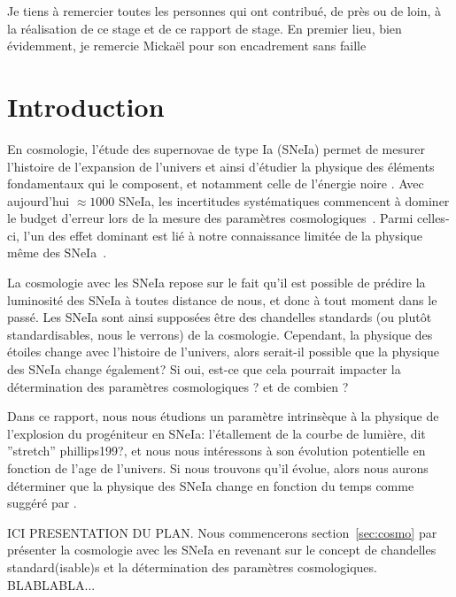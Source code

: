 \documentclass[a4paper, 12pt, svgnames]{article}
\newcommand{\mr}[1]{{\textcolor[rgb]{0.80,0.10,0.1}{#1}}}
\begin{document}

Je tiens à remercier toutes les personnes qui ont contribué, de près ou de loin,
à la réalisation de ce stage et de ce rapport de stage. En premier lieu, bien
évidemment, je remercie Mickaël  pour son encadrement sans faille

\tableofcontents
\newpage

\section{Introduction}\label{sec:int}

En cosmologie, l'étude des supernovae de type Ia (SNeIa) permet de mesurer
l'histoire de l'expansion de l'univers et ainsi d'étudier la physique des
éléments fondamentaux qui le composent, et notamment celle de l'énergie noire
\cite{perlmutter_measurements_1999, riess_observational_1998}. Avec aujourd'hui
$\approx1000$ SNeIa, les incertitudes systématiques commencent à dominer le
budget d'erreur lors de la mesure des paramètres
cosmologiques~\cite{betoule_improved_2014, scolnic_complete_2018}. Parmi
celles-ci, l'un des effet dominant est lié à notre connaissance limitée de la
physique même des SNeIa~\cite{sullivan_dependence_2010, rigault_evidence_2013,
rigault_confirmation_2015}.

La cosmologie avec les SNeIa repose sur le fait qu'il est possible de
prédire la luminosité des SNeIa à toutes distance de nous, et donc à tout moment
dans le passé. Les SNeIa sont ainsi supposées être des chandelles standards (ou
plutôt standardisables, nous le verrons) de la cosmologie. Cependant, la
physique des étoiles change avec l'histoire de l'univers, alors serait-il
possible que la physique des SNeIa change également? Si oui, est-ce que cela
pourrait impacter la détermination des paramètres cosmologiques ? et de combien
? 

Dans ce rapport, nous \mr{nous étudions un paramètre intrinsèque à la physique
de l'explosion du progéniteur en SNeIa: l'étallement de la courbe de lumière,
dit ”stretch” \mr{phillips199?}, et nous nous intéressons à son évolution
potentielle en fonction de l'age de l'univers. Si nous trouvons qu'il évolue,
alors nous aurons déterminer que la physique des SNeIa change en fonction du
temps comme suggéré par
\cite{howell_effect_2009, rigault_evidence_2013, childress_ages_2014,
rigault_strong_2018}.}

\mr{ICI PRESENTATION DU PLAN. Nous commencerons section~\ref{sec:cosmo} par
présenter la cosmologie avec les SNeIa en revenant sur le concept de chandelles
standard(isable)s et la détermination des paramètres cosmologiques.
BLABLABLA...}
\end{document}
